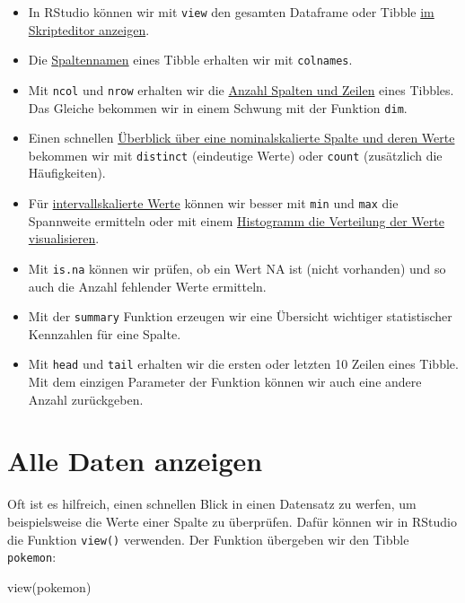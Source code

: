 \documentclass[
]{book}
\newenvironment{Shaded}{\begin{snugshade}}{\end{snugshade}}
\newcommand{\FunctionTok}[1]{\textcolor[rgb]{0.00,0.00,0.00}{#1}}
\newcommand{\NormalTok}[1]{#1}
\providecommand{\tightlist}{%
  \setlength{\itemsep}{0pt}\setlength{\parskip}{0pt}}
\begin{document}
\begin{itemize}
\tightlist
\item
  In RStudio können wir mit \texttt{view} den gesamten Dataframe oder Tibble \protect\hyperlink{alle-daten-anzeigen}{im Skripteditor anzeigen}.
\item
  Die \protect\hyperlink{spaltennamen-ermitteln}{Spaltennamen} eines Tibble erhalten wir mit \texttt{colnames}.
\item
  Mit \texttt{ncol} und \texttt{nrow} erhalten wir die \protect\hyperlink{anzahl-spalten-zeilen}{Anzahl Spalten und Zeilen} eines Tibbles. Das Gleiche bekommen wir in einem Schwung mit der Funktion \texttt{dim}.
\item
  Einen schnellen \protect\hyperlink{wertebereich-nominalskaliert}{Überblick über eine nominalskalierte Spalte und deren Werte} bekommen wir mit \texttt{distinct} (eindeutige Werte) oder \texttt{count} (zusätzlich die Häufigkeiten).
\item
  Für \protect\hyperlink{wertebereich-intervallskaliert}{intervallskalierte Werte} können wir besser mit \texttt{min} und \texttt{max} die Spannweite ermitteln oder mit einem \protect\hyperlink{wertebereich-intervallskaliert-histogramm}{Histogramm die Verteilung der Werte visualisieren}.
\item
  Mit \texttt{is.na} können wir prüfen, ob ein Wert NA ist (nicht vorhanden) und so auch die Anzahl fehlender Werte ermitteln.
\item
  Mit der \texttt{summary} Funktion erzeugen wir eine Übersicht wichtiger statistischer Kennzahlen für eine Spalte.
\item
  Mit \texttt{head} und \texttt{tail} erhalten wir die ersten oder letzten 10 Zeilen eines Tibble. Mit dem einzigen Parameter der Funktion können wir auch eine andere Anzahl zurückgeben.
\end{itemize}

\hypertarget{alle-daten-anzeigen}{%
\section{Alle Daten anzeigen}\label{alle-daten-anzeigen}}

Oft ist es hilfreich, einen schnellen Blick in einen Datensatz zu werfen, um beispielsweise die Werte einer Spalte zu überprüfen. Dafür können wir in RStudio die Funktion \texttt{view()} verwenden. Der Funktion übergeben wir den Tibble \texttt{pokemon}:

\begin{Shaded}
\begin{Highlighting}[]
\FunctionTok{view}\NormalTok{(pokemon)}
\end{Highlighting}
\end{Shaded}
\end{document}
